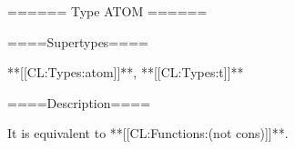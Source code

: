 ====== Type ATOM ======

====Supertypes====

**[[CL:Types:atom]]**, **[[CL:Types:t]]**

====Description====

It is equivalent to **[[CL:Functions:(not cons)]]**.

